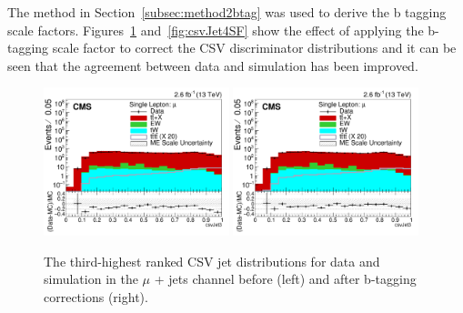 The method in Section~\ref{subsec:method2btag} was used to derive the b tagging scale factors. Figures~\ref{fig:csvJet3SF} and~\ref{fig:csvJet4SF} show the effect of applying the b-tagging scale factor to correct the CSV discriminator distributions and it can be seen that the agreement between data and simulation has been improved.

\begin{figure}[ht!]
    \includegraphics[width=0.48\textwidth]{images/Run2/csvJet3_StackLogY_noSF.pdf}
    \includegraphics[width=0.48\textwidth]{images/Run2/csvJet3_StackLogY.pdf}
    \caption{ The third-highest ranked CSV jet distributions for data and simulation in the $\mu$ + jets channel before (left) and after b-tagging corrections (right).}
    \label{fig:csvJet3SF}
\end{figure}
